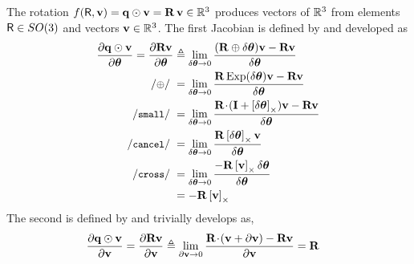 The rotation $f(\mathsf R,{\bf v}) = {\bf q}\odot{\bf v} = {\bf R}\,{\bf v} \in {\mathbb R}^3$ produces vectors of ${\mathbb R}^3$ from elements $\mathsf R\in SO(3)$ and vectors ${\bf v}\in{\mathbb R}^3$. The first Jacobian is defined by  and developed as
%
\begin{align*}
\dpar{\bfq\od\bfv}{\bth} = \dpar{\bfR\bfv}{\bth} 
&\te \lim_{\delta\bth\to0}\frac{(\bfR\oplus\delta\bth)\bfv-\bfR\bfv}{\delta\bth} \\
\com{$\oplus$}
&= \lim_{\delta\bth\to0}\frac{\bfR\Exp(\delta\bth)\bfv-\bfR\bfv}{\delta\bth} \\
\csmall
&= \lim_{\delta\bth\to0}\frac{\bfR\tdot(\bfI+\hatx{\delta\bth})\bfv-\bfR\bfv}{\delta\bth} \\
\ccancel
&= \lim_{\delta\bth\to0}\frac{\bfR\hatx{\delta\bth}\bfv}{\delta\bth} \\
\ccross
&= \lim_{\delta\bth\to0}\frac{-\bfR\hatx{\bfv}\delta\bth}{\delta\bth} \\
&= -\bfR\hatx{\bfv} 
\end{align*}
%
The second  is defined by  and trivially develops as,
%
\begin{align*}
\frac{\partial{\bf q}\odot{\bf v}}{\partial{\bf v}} = \frac{\partial{\bf R}{\bf v}}{\partial{\bf v}} 
&\triangleq \lim_{\partial{\bf v}\to0}\frac{{\bf R}\!\cdot\!({\bf v}+\partial{\bf v})-{\bf R}{\bf v}}{\partial{\bf v}} 
= {\bf R}
\end{align*}





